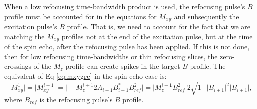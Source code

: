 \documentclass[11pt]{article}
\begin{document}
\par When a low refocusing time-bandwidth product is used, 
the refocusing pulse's $B$ profile must be accounted for in the equations for $M_{xy}$ and subsequently 
the excitation pulse's $B$ profile.
That is, we need to account for the fact that we are matching the $M_{xy}$ profiles not at the end of the excitation pulse,
but at the time of the spin echo, after the refocusing pulse has been applied. 
If this is not done, then for low refocusing time-bandwidths or thin refocusing slices, 
the zero-crossings of the $M_z$ profile can create spikes in the target $B$ profile. 
The equivalent of Eq \ref{eq:mxygre} in the spin echo case is:
\begin{equation}
\vert M_{xy}^1 \vert = \vert M_{xy}^{i+1} \vert =  \vert -M_z^{i+1} 2 A_{i+1} B^*_{i+1} B^2_{ref} \vert = \vert M_z^{i+1} B^2_{ref} \vert 2 \sqrt{1 - \vert B_{i+1} \vert^2} \vert B_{i+1} \vert,
\label{eq:mxyse}
\end{equation}
where $B_{ref}$ is the refocusing pulse's $B$ profile. 
\end{document}

